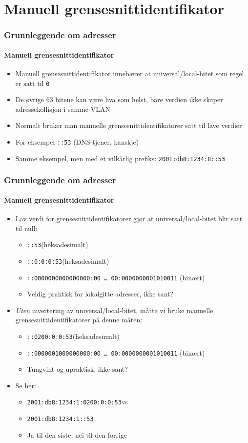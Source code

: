 \section{Manuell grensesnittidentifikator}
\begin{frame}
  \frametitle{Grunnleggende om adresser}
  \framesubtitle{Manuell grensesnittidentifikator}
  \begin{itemize}
  \item Manuell grensesnittidentifikator innebærer at
    universal/local-bitet som regel er satt til \texttt{0}
  \item De øvrige 63 bitene kan være hva som helst, bare verdien ikke
    skaper adressekollisjon i samme VLAN
  \item Normalt bruker man manuelle grensesnittidentifikatorer satt
    til lave verdier
  \item For eksempel \texttt{::53} \hfill(DNS-tjener, kanskje)
  \item Samme eksempel, men med et vilkårlig prefiks:
    \texttt{2001:db8:1234:8::\alert{53}}
  \end{itemize}
\end{frame}

\begin{frame}
  \frametitle{Grunnleggende om adresser}
  \framesubtitle{Manuell grensesnittidentifikator}
  \begin{itemize}
  \item Lav verdi for grensesnittidentifikatorer gjør at
    universal/local-bitet blir satt til null:
    \begin{itemize}
    \item \texttt{::53}\hfill(heksadesimalt)
    \item \texttt{::\alert{0}:0:0:53}\hfill(heksadesimalt)
    \item \texttt{::000000\alert{0}000000000:00~\dots~00:0000000001010011}
      \hfill(binært)
    \item Veldig praktisk for lokalgitte adresser, ikke sant?
    \end{itemize}
  \item \textit{Uten\/} invertering av universal/local-bitet, måtte vi
    bruke manuelle grensesnittidentifikatorer på denne måten:
    \begin{itemize}
    \item \texttt{::0\alert{2}00:0:0:53}\hfill(heksadesimalt)
    \item \texttt{::000000\alert{1}000000000:00~\dots~00:0000000001010011}
      \hfill(binært)
    \item Tungvint og upraktisk, ikke sant?
    \end{itemize}
  \item Se her:
    \begin{itemize}
    \item \texttt{2001:db8:1234:1:0200:0:0:53}\quad vs
    \item \texttt{2001:db8:1234:1::53}
    \item Ja til den siste, nei til den forrige
    \end{itemize}
  \end{itemize}
\end{frame}

